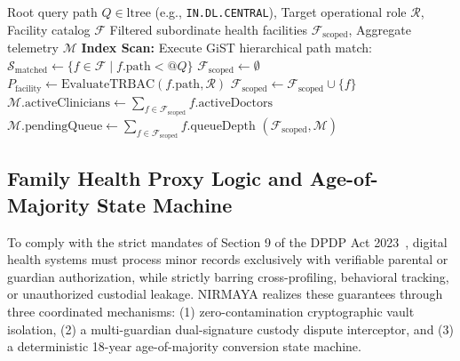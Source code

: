 \documentclass[journal,twocolumn]{IEEEtran}
\begin{document}
\begin{algorithm}[t]
\caption{Sub-2ms 6-Tier Indian LGD Territorial Scope Traversal with PostgreSQL \texttt{ltree}}
\label{alg:lgd_traversal}
\begin{algorithmic}[1]
\REQUIRE Root query path $Q \in \text{ltree}$ (e.g., \texttt{IN.DL.CENTRAL}), Target operational role $\mathcal{R}$, Facility catalog $\mathcal{F}$
\ENSURE Filtered subordinate health facilities $\mathcal{F}_{\text{scoped}}$, Aggregate telemetry $\mathcal{M}$
\STATE \textbf{Index Scan:} Execute GiST hierarchical path match:
\STATE $\mathcal{S}_{\text{matched}} \leftarrow \{f \in \mathcal{F} \mid f.\text{path} <@ Q\}$ 
\STATE $\mathcal{F}_{\text{scoped}} \leftarrow \emptyset$
    \STATE $P_{\text{facility}} \leftarrow \text{EvaluateTRBAC}(f.\text{path}, \mathcal{R})$
        \STATE $\mathcal{F}_{\text{scoped}} \leftarrow \mathcal{F}_{\text{scoped}} \cup \{f\}$
    \ENDIF
\ENDFOR
\STATE $\mathcal{M}.\text{activeClinicians} \leftarrow \sum_{f \in \mathcal{F}_{\text{scoped}}} f.\text{activeDoctors}$
\STATE $\mathcal{M}.\text{pendingQueue} \leftarrow \sum_{f \in \mathcal{F}_{\text{scoped}}} f.\text{queueDepth}$
\RETURN $(\mathcal{F}_{\text{scoped}}, \mathcal{M})$
\end{algorithmic}
\end{algorithm}

\subsection{Family Health Proxy Logic and Age-of-Majority State Machine}
\label{sec:family_proxy}

To comply with the strict mandates of Section 9 of the DPDP Act 2023~\cite{dpdp_act_2023}, digital health systems must process minor records exclusively with verifiable parental or guardian authorization, while strictly barring cross-profiling, behavioral tracking, or unauthorized custodial leakage. NIRMAYA realizes these guarantees through three coordinated mechanisms: (1) zero-contamination cryptographic vault isolation, (2) a multi-guardian dual-signature custody dispute interceptor, and (3) a deterministic 18-year age-of-majority conversion state machine.
\end{document}
